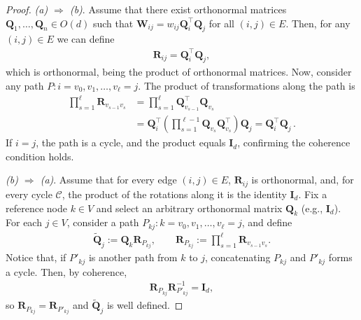 \documentclass[aps,showpacs,preprintnumbers,amsmath,amssymb,twocolumn,superscriptaddress,floatfix,nofootinbib,10pt,pre]{revtex4-1}
\begin{document}
\begin{proof}
\textit{(a) $\Rightarrow$ (b)}. Assume that there exist orthonormal matrices $\mathbf{Q}_1,\dots,\mathbf{Q}_n\in O(d)$ such that $\mathbf{W}_{ij} = w_{ij}\mathbf{Q}_i^\top \mathbf{Q}_j$ for all $(i,j)\in E$. Then, for any $(i,j)\in E$ we can define
\begin{align}
\label{eq:defQtQ}
    \mathbf{R}_{ij}=\mathbf{Q}_i^\top \mathbf{Q}_j,
\end{align}
which is orthonormal, being the product of orthonormal matrices. Now, consider any path $P:i=v_0,v_1,\dots,v_\ell=j$. The product of transformations along the path is
\begin{align}
    \prod_{s=1}^\ell \mathbf{R}_{v_{s-1}v_s} 
    &= \prod_{s=1}^\ell \mathbf{Q}_{v_{s-1}}^\top \mathbf{Q}_{v_s}\nonumber\\
    &= \mathbf{Q}_i^\top \left(\prod_{s=1}^{\ell-1} \mathbf{Q}_{v_s}\mathbf{Q}_{v_s}^\top\right)\mathbf{Q}_j
    = \mathbf{Q}_i^\top \mathbf{Q}_j\, .
\end{align}
If $i=j$, the path is a cycle, and the product equals $\mathbf{I}_d$, confirming the coherence condition holds.

\medskip
\textit{(b) $\Rightarrow$ (a)}.  
Assume that for every edge $(i,j)\in E$, $\mathbf{R}_{ij}$ is orthonormal, and, for every cycle $\mathcal C$, the product of the rotations along it is the identity $\mathbf{I}_d$.  
Fix a reference node $k\in V$ and select an arbitrary orthonormal matrix $\mathbf{Q}_k$ (e.g., $\mathbf{I}_d$).  
For each $j\in V$, consider a path $P_{kj}:k=v_0,v_1,\dots,v_\ell=j$, and define
\begin{align}
    \widetilde{\mathbf{Q}}_j := \mathbf{Q}_k \mathbf{R}_{P_{kj}}, \qquad 
    \mathbf{R}_{P_{kj}} := \prod_{s=1}^\ell \mathbf{R}_{v_{s-1}v_s}.
\end{align}
Notice that, if ${P'_{kj}}$ is another path from $k$ to $j$, concatenating ${P_{kj}}$ and ${P'_{kj}}$ forms a cycle. Then, by coherence,
\begin{align}
    \mathbf{R}_{P_{kj}} \mathbf{R}_{{P'_{kj}}}^{-1} = \mathbf{I}_d,
\end{align}
so $\mathbf{R}_{P_{kj}}=\mathbf{R}_{{P'_{kj}}}$ and $\widetilde{\mathbf{Q}}_j$ is well defined.  


\end{proof}
\end{document}

